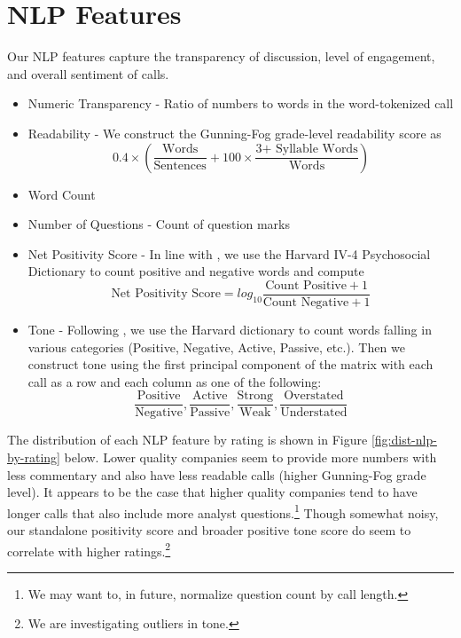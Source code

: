 \documentclass{article}[11pt]
\begin{document}
    \section*{NLP Features}

    Our NLP features capture the transparency of discussion, level of engagement, and overall sentiment of calls.

    \begin{itemize}
        \item Numeric Transparency - Ratio of numbers to words in the word-tokenized call
        \item Readability - We construct the Gunning-Fog grade-level readability score \citep{gunning_technique_1952} as 
        \begin{equation*}
            0.4 \times (\frac{\text{Words}}{\text{Sentences}} + 100 \times \frac{\text{3+ Syllable Words}}{\text{Words}})
        \end{equation*}
        \item Word Count
        \item Number of Questions - Count of question marks
        \item Net Positivity Score - In line with \cite{kantos_comparative_2022}, we use the Harvard IV-4 Psychosocial Dictionary \cite{noauthor_inquirer_nodate} to count positive and negative words and compute
        \begin{equation*}
            \text{Net Positivity Score} = log_{10}\frac{\text{Count Positive} + 1}{\text{Count Negative} + 1}
        \end{equation*}
        \item Tone - Following \cite{price_earnings_2012}, we use the Harvard dictionary to count words falling in various categories (Positive, Negative, Active, Passive, etc.). Then we construct tone using the first principal component of the matrix with each call as a row and each column as one of the following:
        \begin{equation*}
            \frac{\text{Positive}}{\text{Negative}}, \frac{\text{Active}}{\text{Passive}}, \frac{\text{Strong}}{\text{Weak}}, \frac{\text{Overstated}}{\text{Understated}}
        \end{equation*}
    \end{itemize}
    
    The distribution of each NLP feature by rating is shown in Figure \ref{fig:dist-nlp-by-rating} below.  Lower quality companies seem to provide more numbers with less commentary and also have less readable calls (higher Gunning-Fog grade level). It appears to be the case that higher quality companies tend to have longer calls that also include more analyst questions.\footnote{We may want to, in future, normalize question count by call length.} Though somewhat noisy, our standalone positivity score and broader positive tone score do seem to correlate with higher ratings.\footnote{We are investigating outliers in tone.}
\end{document}
